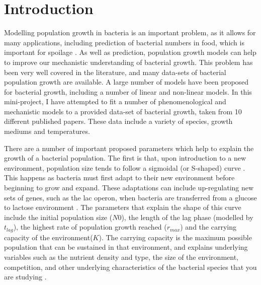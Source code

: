 \documentclass[11pt,a4wide,titlepage]{article}
\begin{document}
\section*{Introduction}
Modelling population growth in bacteria is an important problem, as it allows for many applications, including prediction of bacterial numbers in food, which is important for spoilage \citep{pelegMicrobialGrowthCurves2011}. As well as prediction, population growth models can help to improve our mechanistic understanding of bacterial growth. This problem has been very well covered in the literature, and many data-sets of bacterial population growth are available. A large number of models have been proposed for bacterial growth, including a number of linear and non-linear models. In this mini-project, I have attempted to fit a number of phenomenological and mechanistic models to a provided data-set of bacterial growth, taken from 10 different published papers. These data include a variety of species, growth mediums and temperatures.

There are a number of important proposed parameters which help to explain the growth of a bacterial population. The first is that, upon introduction to a new environment, population size tends to follow a sigmoidal (or S-shaped) curve \citep{zwieteringModelingBacterialGrowth1990}. This happens as bacteria must first adapt to their new environment before beginning to grow and expand. These adaptations can include up-regulating new sets of genes, such as the lac operon, when bacteria are transferred from a glucose to lactose environment \citep{buchananWhenSimpleGood1997}. The parameters that explain the shape of this curve include the initial population size ($N0$), the length of the lag phase (modelled by $t_{lag}$), the highest rate of population growth reached ($r_{max}$) and the carrying capacity  of the environment($K$). The carrying capacity is the maximum possible population that can be sustained in that environment, and explains underlying variables such as the nutrient density and type, the size of the environment, competition, and other underlying characteristics of the bacterial species that you are studying \citep{bernhardtMetabolicTheoryTemperatureSize2018}.
\end{document}
